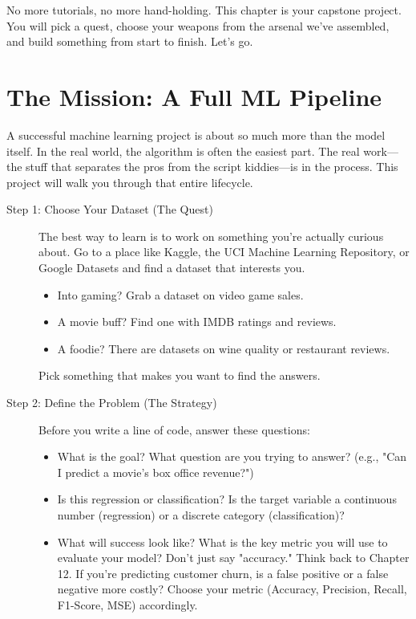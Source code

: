 \documentclass[11pt, letterpaper, openany]{book}
\begin{document}
No more tutorials, no more hand-holding. This chapter is your capstone project. You will pick a quest, choose your weapons from the arsenal we've assembled, and build something from start to finish. Let's go.

\section{The Mission: A Full ML Pipeline}

A successful machine learning project is about so much more than the model itself. In the real world, the algorithm is often the easiest part. The real work—the stuff that separates the pros from the script kiddies—is in the process. This project will walk you through that entire lifecycle.

\begin{description}
    \item[Step 1: Choose Your Dataset (The Quest)] The best way to learn is to work on something you're actually curious about. Go to a place like Kaggle, the UCI Machine Learning Repository, or Google Datasets and find a dataset that interests you.
    \begin{itemize}
        \item Into gaming? Grab a dataset on video game sales.
        \item A movie buff? Find one with IMDB ratings and reviews.
        \item A foodie? There are datasets on wine quality or restaurant reviews.
    \end{itemize}
    Pick something that makes you want to find the answers.
    
    \item[Step 2: Define the Problem (The Strategy)] Before you write a line of code, answer these questions:
    \begin{itemize}
        \item What is the goal? What question are you trying to answer? (e.g., "Can I predict a movie's box office revenue?")
        \item Is this regression or classification? Is the target variable a continuous number (regression) or a discrete category (classification)?
        \item What will success look like? What is the key metric you will use to evaluate your model? Don't just say "accuracy." Think back to Chapter 12. If you're predicting customer churn, is a false positive or a false negative more costly? Choose your metric (Accuracy, Precision, Recall, F1-Score, MSE) accordingly.
    \end{itemize}
    

\end{description}
\end{document}
